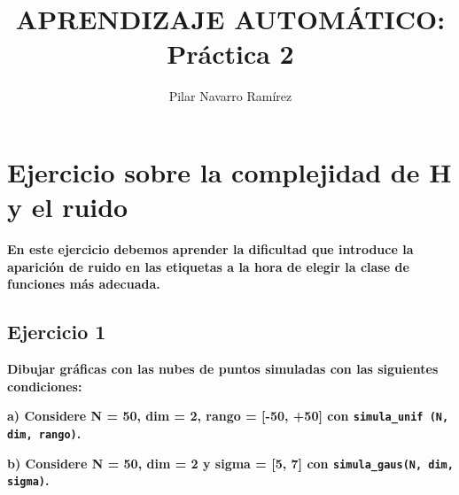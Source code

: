 \documentclass[a4]{article}
\author{Pilar Navarro Ramírez}
\date{\vspace{-5mm}}
\title{\huge APRENDIZAJE AUTOMÁTICO: Práctica 2 \HRule\vspace{-4mm}}
\begin{document}
\maketitle
\tableofcontents

\newpage

\section{Ejercicio sobre la complejidad de H y el ruido}

\textbf{En este ejercicio debemos aprender la dificultad que introduce la aparición de ruido en las
etiquetas a la hora de elegir la clase de funciones más adecuada.}

\subsection{Ejercicio 1}
\textbf{Dibujar gráficas con las nubes de puntos simuladas con las siguientes condiciones:}

\textbf{a) Considere N = 50, dim = 2, rango = [-50, +50] con \lstinline|simula_unif (N, dim, rango)|.}

\textbf{b) Considere N = 50, dim = 2 y sigma = [5, 7] con \lstinline|simula_gaus(N, dim, sigma)|.}
\end{document}
